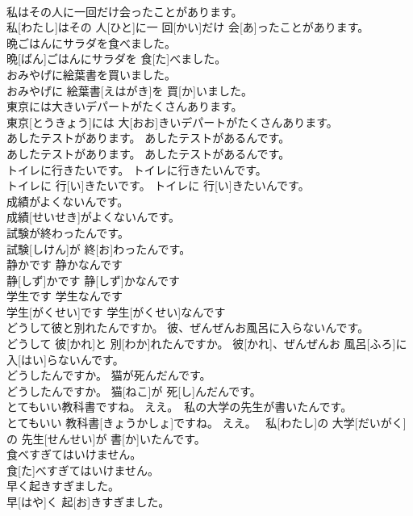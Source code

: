\documentclass[8pt]{extreport}
\begin{document}
\begin{CJK}{UTF8}{min}
\\	私はその人に一回だけ会ったことがあります。	
\\	私[わたし]はその 人[ひと]に一 回[かい]だけ 会[あ]ったことがあります。	
\\	晩ごはんにサラダを食べました。	
\\	晩[ばん]ごはんにサラダを 食[た]べました。	
\\	おみやげに絵葉書を買いました。	
\\	おみやげに 絵葉書[えはがき]を 買[か]いました。	
\\	東京には大きいデパートがたくさんあります。	
\\	東京[とうきょう]には 大[おお]きいデパートがたくさんあります。	
\\	あしたテストがあります。 あしたテストがあるんです。	
\\	あしたテストがあります。 あしたテストがあるんです。	
\\	トイレに行きたいです。 トイレに行きたいんです。	
\\	トイレに 行[い]きたいです。 トイレに 行[い]きたいんです。	
\\	成績がよくないんです。	
\\	成績[せいせき]がよくないんです。	
\\	試験が終わったんです。	
\\	試験[しけん]が 終[お]わったんです。	
\\	静かです 静かなんです	
\\	静[しず]かです 静[しず]かなんです	
\\	学生です 学生なんです	
\\	学生[がくせい]です 学生[がくせい]なんです	
\\	どうして彼と別れたんですか。 彼、ぜんぜんお風呂に入らないんです。	
\\	どうして 彼[かれ]と 別[わか]れたんですか。 彼[かれ]、ぜんぜんお 風呂[ふろ]に 入[はい]らないんです。	
\\	どうしたんですか。 猫が死んだんです。	
\\	どうしたんですか。 猫[ねこ]が 死[し]んだんです。	
\\	とてもいい教科書ですね。 ええ。　私の大学の先生が書いたんです。	
\\	とてもいい 教科書[きょうかしょ]ですね。 ええ。　 私[わたし]の 大学[だいがく]の 先生[せんせい]が 書[か]いたんです。	
\\	食べすぎてはいけません。	
\\	食[た]べすぎてはいけません。	
\\	早く起きすぎました。	
\\	早[はや]く 起[お]きすぎました。	

\end{CJK}
\end{document}
